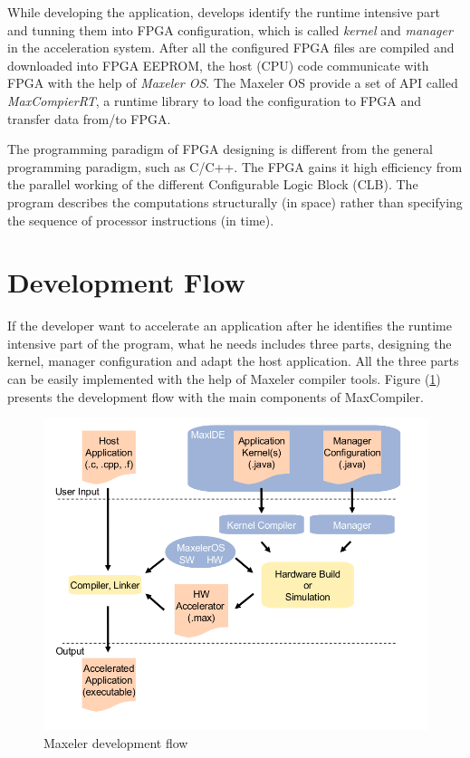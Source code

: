 While developing the application, develops identify the runtime intensive part
and tunning them into FPGA configuration, which is called \emph{kernel} and
\emph{manager} in the acceleration system. After all the configured FPGA
files are compiled and downloaded into FPGA EEPROM, the host (CPU) code
communicate with FPGA with the help of \emph{Maxeler OS}. The Maxeler OS
provide a set of API called \emph{MaxCompierRT}, a runtime library to load
the configuration to FPGA and transfer data from/to FPGA.

The programming paradigm of FPGA designing is different from the general
programming paradigm, such as C/C++. The FPGA gains it high efficiency from
the parallel working of the different Configurable Logic Block (CLB). The
program describes the computations structurally (in space) rather than
specifying the sequence of processor instructions (in
time)\cite{max_white_paper}.

\section{Development Flow}
If the developer want to accelerate an application after he identifies the
runtime intensive part of the program, what he needs includes three parts,
designing the kernel, manager configuration and adapt the host application.
All the three parts can be easily implemented with the help of Maxeler
compiler tools. Figure (\ref{fig:development_flow}) presents the development flow with the main
components of MaxCompiler.

\begin{figure}[h]
  \centering
  \includegraphics[scale=0.4]{img/development_flow.png}
  \caption{Maxeler development flow}
  \label{fig:development_flow}
\end{figure}

